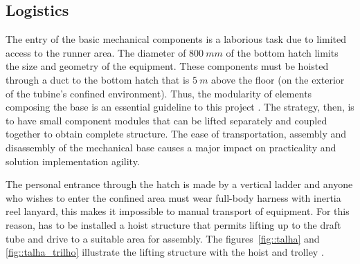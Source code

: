\subsection{Logistics}

The entry of the basic mechanical components is a laborious task due to limited
access to the runner area. The diameter of  $ 800~mm $ of the bottom hatch
limits the size and geometry of the equipment.
These components must be hoisted through a duct to the bottom hatch that is $
5~m $ above the floor (on the exterior of the tubine's confined environment).
Thus, the modularity of elements composing the base is an essential guideline
to this project . The strategy, then, is to have small component modules that
can be lifted separately and coupled together to obtain complete structure.
The ease of transportation, assembly and disassembly of the mechanical base
causes a major impact on practicality and solution implementation agility.

% 
% 


The personal entrance through the hatch is made by a vertical ladder and anyone
who wishes to enter the confined area must wear full-body harness with inertia
reel lanyard, this makes it impossible to
manual transport of equipment. For this reason, has to be installed a
hoist structure that permits lifting up to the draft tube and
drive to a suitable area for assembly. 
The figures~\ref{fig::talha} and \ref{fig::talha_trilho} illustrate the lifting
structure with the hoist and trolley .


  
